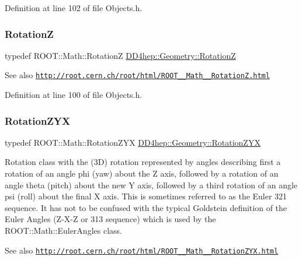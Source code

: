 Definition at line 102 of file Objects.\+h.

\hypertarget{namespace_d_d4hep_1_1_geometry_ac5c5b2c9ea8e14caecff444e8f9678ec}{}\label{namespace_d_d4hep_1_1_geometry_ac5c5b2c9ea8e14caecff444e8f9678ec} 
\subsubsection{\texorpdfstring{RotationZ}{RotationZ}}
{\footnotesize\ttfamily typedef R\+O\+O\+T\+::\+Math\+::\+RotationZ \hyperlink{namespace_d_d4hep_1_1_geometry_ac5c5b2c9ea8e14caecff444e8f9678ec}{D\+D4hep\+::\+Geometry\+::\+RotationZ}}

\begin{DoxySeeAlso}{See also}
\href{http://root.cern.ch/root/html/ROOT__Math__RotationZ.html}{\tt http\+://root.\+cern.\+ch/root/html/\+R\+O\+O\+T\+\_\+\+\_\+\+Math\+\_\+\+\_\+\+Rotation\+Z.\+html} 
\end{DoxySeeAlso}


Definition at line 100 of file Objects.\+h.

\hypertarget{namespace_d_d4hep_1_1_geometry_a24667b2b9c3cec3d5239828db4d52189}{}\label{namespace_d_d4hep_1_1_geometry_a24667b2b9c3cec3d5239828db4d52189} 
\subsubsection{\texorpdfstring{Rotation\+Z\+YX}{RotationZYX}}
{\footnotesize\ttfamily typedef R\+O\+O\+T\+::\+Math\+::\+Rotation\+Z\+YX \hyperlink{namespace_d_d4hep_1_1_geometry_a24667b2b9c3cec3d5239828db4d52189}{D\+D4hep\+::\+Geometry\+::\+Rotation\+Z\+YX}}

Rotation class with the (3D) rotation represented by angles describing first a rotation of an angle phi (yaw) about the Z axis, followed by a rotation of an angle theta (pitch) about the new Y\textquotesingle{} axis, followed by a third rotation of an angle psi (roll) about the final X\textquotesingle{}\textquotesingle{} axis. This is sometimes referred to as the Euler 321 sequence. It has not to be confused with the typical Goldstein definition of the Euler Angles (Z-\/\+X-\/Z or 313 sequence) which is used by the R\+O\+O\+T\+::\+Math\+::\+Euler\+Angles class. \begin{DoxySeeAlso}{See also}
\href{http://root.cern.ch/root/html/ROOT__Math__RotationZYX.html}{\tt http\+://root.\+cern.\+ch/root/html/\+R\+O\+O\+T\+\_\+\+\_\+\+Math\+\_\+\+\_\+\+Rotation\+Z\+Y\+X.\+html} 
\end{DoxySeeAlso}



